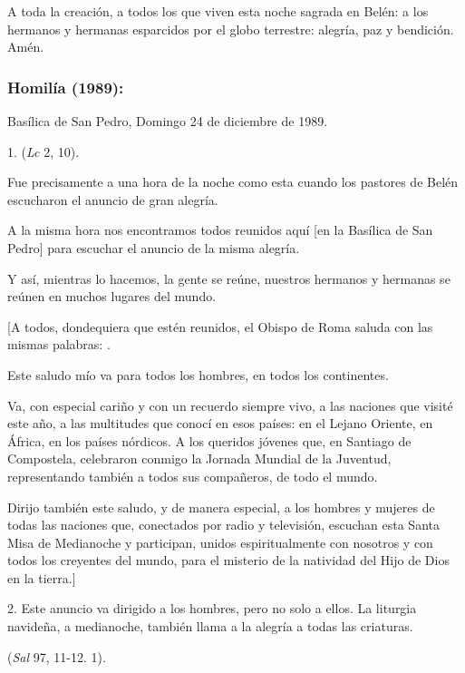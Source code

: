 \begin{body}
\begin{body}
		A toda la creación, a todos los que viven esta noche sagrada en Belén: a los hermanos y hermanas esparcidos por el globo terrestre: alegría, paz y bendición. Amén.
	\end{body}
	
	\subsubsection{Homilía (1989): }
	
	Basílica de San Pedro, Domingo 24 de diciembre de 1989.
	
	\begin{body}
		1.  (\emph{Lc} 2, 10).
		
		Fue precisamente a una hora de la noche como esta cuando los pastores de Belén escucharon el anuncio de gran alegría.
		
		A la misma hora nos encontramos todos reunidos aquí {[}en la Basílica de San Pedro{]} para escuchar el anuncio de la misma alegría.
		
		Y así, mientras lo hacemos, la gente se reúne, nuestros hermanos y hermanas se reúnen en muchos lugares del mundo.
		
		{[}A todos, dondequiera que estén reunidos, el Obispo de Roma saluda con las mismas palabras: .
		
		Este saludo mío va para todos los hombres, en todos los continentes.
		
		Va, con especial cariño y con un recuerdo siempre vivo, a las naciones que visité este año, a las multitudes que conocí en esos países: en el Lejano Oriente, en África, en los países nórdicos. A los queridos jóvenes que, en Santiago de Compostela, celebraron conmigo la Jornada Mundial de la Juventud, representando también a todos sus compañeros, de todo el mundo.
		
		Dirijo también este saludo, y de manera especial, a los hombres y mujeres de todas las naciones que, conectados por radio y televisión, escuchan esta Santa Misa de Medianoche y participan, unidos espiritualmente con nosotros y con todos los creyentes del mundo, para el misterio de la natividad del Hijo de Dios en la tierra.{]}
		
		2. Este anuncio va dirigido a los hombres, pero no solo a ellos. La liturgia navideña, a medianoche, también llama a la alegría a todas las criaturas.
		
		 (\emph{Sal} 97, 11-12. 1).
		

\end{body}
\end{body}
